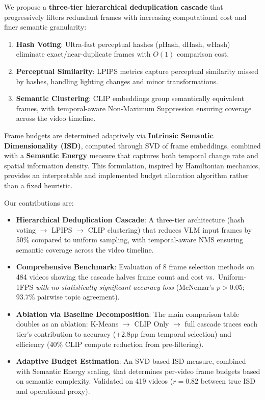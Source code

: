 \documentclass[sigconf,nonacm]{acmart}
\begin{document}
We propose a \textbf{three-tier hierarchical deduplication cascade} that progressively filters redundant frames with increasing computational cost and finer semantic granularity:
\begin{enumerate}
    \item \textbf{Hash Voting}: Ultra-fast perceptual hashes (pHash, dHash, wHash) eliminate exact/near-duplicate frames with $O(1)$ comparison cost.
    \item \textbf{Perceptual Similarity}: LPIPS metrics capture perceptual similarity missed by hashes, handling lighting changes and minor transformations.
    \item \textbf{Semantic Clustering}: CLIP embeddings group semantically equivalent frames, with temporal-aware Non-Maximum Suppression ensuring coverage across the video timeline.
\end{enumerate}

Frame budgets are determined adaptively via \textbf{Intrinsic Semantic Dimensionality (ISD)}, computed through SVD of frame embeddings, combined with a \textbf{Semantic Energy} measure that captures both temporal change rate and spatial information density. This formulation, inspired by Hamiltonian mechanics, provides an interpretable and implemented budget allocation algorithm rather than a fixed heuristic.

Our contributions are:
\begin{itemize}
    \item \textbf{Hierarchical Deduplication Cascade}: A three-tier architecture (hash voting $\rightarrow$ LPIPS $\rightarrow$ CLIP clustering) that reduces VLM input frames by 50\% compared to uniform sampling, with temporal-aware NMS ensuring semantic coverage across the video timeline.
    \item \textbf{Comprehensive Benchmark}: Evaluation of 8 frame selection methods on 484 videos showing the cascade halves frame count and cost vs.\ Uniform-1FPS \textit{with no statistically significant accuracy loss} (McNemar's $p > 0.05$; 93.7\% pairwise topic agreement).
    \item \textbf{Ablation via Baseline Decomposition}: The main comparison table doubles as an ablation: K-Means $\rightarrow$ CLIP Only $\rightarrow$ full cascade traces each tier's contribution to accuracy (+2.8pp from temporal selection) and efficiency (40\% CLIP compute reduction from pre-filtering).
    \item \textbf{Adaptive Budget Estimation}: An SVD-based ISD measure, combined with Semantic Energy scaling, that determines per-video frame budgets based on semantic complexity. Validated on 419 videos ($r = 0.82$ between true ISD and operational proxy).
\end{itemize}
\end{document}
